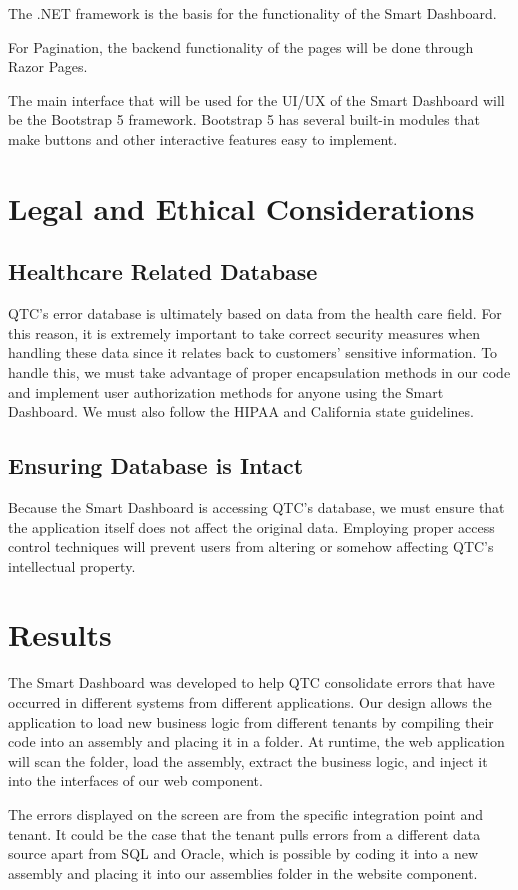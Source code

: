 \documentclass[12pt]{article}
\begin{document}
The .NET framework is the basis for the functionality of the Smart Dashboard.

For Pagination, the backend functionality of the pages will be done through Razor Pages.

The main interface that will be used for the UI/UX of the Smart Dashboard will be the Bootstrap 5 framework. Bootstrap 5 has several built-in modules that make buttons and other interactive features easy to implement.

\section{Legal and Ethical Considerations}
\subsection{Healthcare Related Database}
QTC's error database is ultimately based on data from the health care field. For this reason, it is extremely important to take correct security measures when handling these data since it relates back to customers' sensitive information. To handle this, we must take advantage of proper encapsulation methods in our code and implement user authorization methods for anyone using the Smart Dashboard. We must also follow the HIPAA and California state guidelines. 

\subsection{Ensuring Database is Intact}
Because the Smart Dashboard is accessing QTC's database, we must ensure that the application itself does not affect the original data. Employing proper access control techniques will prevent users from altering or somehow affecting QTC's intellectual property.

\section{Results}
The Smart Dashboard was developed to help QTC consolidate errors that have occurred in different systems from different applications. Our design allows the application to load new business logic from different tenants by compiling their code into an assembly and placing it in a folder. At runtime, the web application will scan the folder, load the assembly, extract the business logic, and inject it into the interfaces of our web component.

The errors displayed on the screen are from the specific integration point and tenant. It could be the case that the tenant pulls errors from a different data source apart from SQL and Oracle, which is possible by coding it into a new assembly and placing it into our assemblies folder in the website component.
\end{document}
